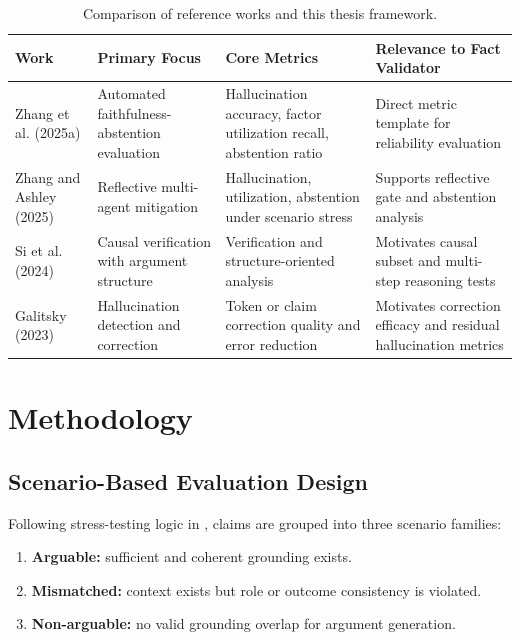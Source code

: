 \documentclass[12pt,a4paper,oneside]{report}
\begin{document}
\begin{table}[htbp]
\centering
\caption{Comparison of reference works and this thesis framework.}
\label{tab:lit-comparison}
\begin{tabular}{p{3.2cm}p{3.6cm}p{3.2cm}p{3.6cm}}
\toprule
\textbf{Work} & \textbf{Primary Focus} & \textbf{Core Metrics} & \textbf{Relevance to Fact Validator} \\
\midrule
Zhang et al. (2025a) \citep{zhang2025faithfulness}
& Automated faithfulness-abstention evaluation
& Hallucination accuracy, factor utilization recall, abstention ratio
& Direct metric template for reliability evaluation \\
\midrule
Zhang and Ashley (2025) \citep{zhang2025reflective}
& Reflective multi-agent mitigation
& Hallucination, utilization, abstention under scenario stress
& Supports reflective gate and abstention analysis \\
\midrule
Si et al. (2024) \citep{si2024checkwhy}
& Causal verification with argument structure
& Verification and structure-oriented analysis
& Motivates causal subset and multi-step reasoning tests \\
\midrule
Galitsky (2023) \citep{galitsky2023truthometer}
& Hallucination detection and correction
& Token or claim correction quality and error reduction
& Motivates correction efficacy and residual hallucination metrics \\
\bottomrule
\end{tabular}
\end{table}

\chapter{Methodology}
\label{chap:method}

\section{Scenario-Based Evaluation Design}
Following stress-testing logic in \citep{zhang2025faithfulness,zhang2025reflective}, claims are grouped into three scenario families:
\begin{enumerate}
  \item \textbf{Arguable:} sufficient and coherent grounding exists.
  \item \textbf{Mismatched:} context exists but role or outcome consistency is violated.
  \item \textbf{Non-arguable:} no valid grounding overlap for argument generation.
\end{enumerate}
\end{document}
